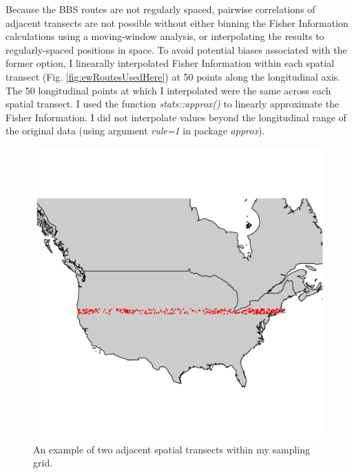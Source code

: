 \documentclass[12pt,twoside,openany]{reedthesis}
\begin{document}
Because the BBS routes are not regularly spaced, pairwise correlations
of adjacent transects are not possible without either binning the Fisher
Information calculations using a moving-window analysis, or
interpolating the results to regularly-spaced positions in space. To
avoid potential biases associated with the former option, I linearally
interpolated Fisher Information within each spatial transect (Fig.
\ref{fig:ewRoutesUsedHere}) at 50 points along the longitudinal axis.
The 50 longitudinal points at which I interpolated were the same across
each spatial transect. I used the function \emph{stats::approx()} to
linearly approximate the Fisher Information. I did not interpolate
values beyond the longitudinal range of the original data (using
argument \emph{rule=1} in package \emph{approx}).
\begin{figure}
\includegraphics[width=0.85\linewidth]{./chapterFiles/fisherSpatial/figures/figsCalledInDiss/transectSamplingEx_1row} \caption{An example of two adjacent spatial transects within my sampling grid.}\label{fig:oneTsectEx}
\end{figure}
\end{document}
